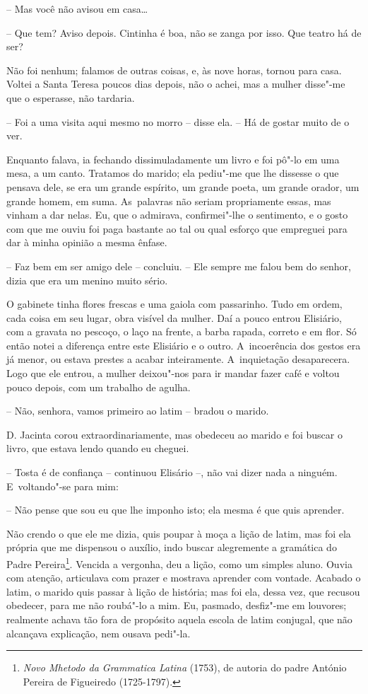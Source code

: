 -- Mas você não avisou em casa\ldots{}

-- Que tem? Aviso depois. Cintinha é boa, não se zanga por isso. Que
teatro há de ser?

Não foi nenhum; falamos de outras coisas, e, às nove horas, tornou para
casa. Voltei a Santa Teresa poucos dias depois, não o achei, mas a
mulher disse"-me que o esperasse, não tardaria.

-- Foi a uma visita aqui mesmo no morro -- disse ela. -- Há de gostar
muito de o ver.

Enquanto falava, ia fechando dissimuladamente um livro e foi pô"-lo em
uma mesa, a um canto. Tratamos do marido; ela pediu"-me que lhe dissesse
o que pensava dele, se era um grande espírito, um grande poeta, um
grande orador, um grande homem, em suma. As~palavras não seriam
propriamente essas, mas vinham a dar nelas. Eu, que o admirava,
confirmei"-lhe o sentimento, e o gosto com que me ouviu foi paga bastante
ao tal ou qual esforço que empreguei para dar à minha opinião a mesma
ênfase.

-- Faz bem em ser amigo dele -- concluiu. -- Ele sempre me falou bem do
senhor, dizia que era um menino muito sério.

O gabinete tinha flores frescas e uma gaiola com passarinho. Tudo em
ordem, cada coisa em seu lugar, obra visível da mulher. Daí a pouco
entrou Elisiário, com a gravata no pescoço, o laço na frente, a barba
rapada, correto e em flor. Só então notei a diferença entre este
Elisiário e o outro. A~incoerência dos gestos era já menor, ou estava
prestes a acabar inteiramente. A~inquietação desaparecera. Logo que ele
entrou, a mulher deixou"-nos para ir mandar fazer café e voltou pouco
depois, com um trabalho de agulha.

-- Não, senhora, vamos primeiro ao latim -- bradou o marido.

D. Jacinta corou extraordinariamente, mas obedeceu ao marido e foi
buscar o livro, que estava lendo quando eu cheguei.

-- Tosta é de confiança -- continuou Elisário --, não vai dizer nada a
ninguém. E~voltando"-se para mim:

-- Não pense que sou eu que lhe imponho isto; ela mesma é que quis
aprender.

Não crendo o que ele me dizia, quis poupar à moça a lição de latim, mas
foi ela própria que me dispensou o auxílio, indo buscar alegremente a
gramática do Padre Pereira\footnote{\emph{Novo Mhetodo da Grammatica
  Latina} (1753), de autoria do padre António Pereira de Figueiredo
  (1725-1797).}. Vencida a vergonha, deu a lição, como um simples aluno.
Ouvia com atenção, articulava com prazer e mostrava aprender com
vontade. Acabado o latim, o marido quis passar à lição de história; mas
foi ela, dessa vez, que recusou obedecer, para me não roubá"-lo a mim.
Eu, pasmado, desfiz"-me em louvores; realmente achava tão fora de
propósito aquela escola de latim conjugal, que não alcançava explicação,
nem ousava pedi"-la.


